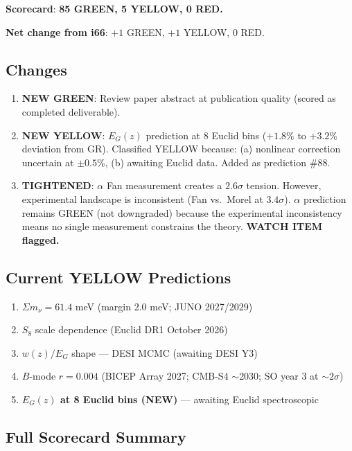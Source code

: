 \documentclass[11pt,a4paper]{article}
\newcommand{\GREEN}{\textcolor{dfdgreen}{\textbf{GREEN}}}
\newcommand{\YELLOW}{\textcolor{dfdyellow}{\textbf{YELLOW}}}
\newcommand{\RED}{\textcolor{dfdred}{\textbf{RED}}}
\begin{document}
\textbf{Scorecard}: \textbf{85 \GREEN, 5 \YELLOW, 0 \RED.}

\textbf{Net change from i66}: $+1$ GREEN, $+1$ YELLOW, $0$ RED.

\subsection{Changes}

\begin{enumerate}
\item \textbf{NEW GREEN}: Review paper abstract at publication quality (scored as completed deliverable).

\item \textbf{NEW YELLOW}: $E_G(z)$ prediction at 8 Euclid bins ($+1.8\%$ to $+3.2\%$ deviation from GR). Classified YELLOW because: (a) nonlinear correction uncertain at $\pm 0.5\%$, (b) awaiting Euclid data. Added as prediction \#88.

\item \textbf{TIGHTENED}: $\alpha$ Fan measurement creates a $2.6\sigma$ tension. However, experimental landscape is inconsistent (Fan vs.\ Morel at $3.4\sigma$). $\alpha$ prediction remains GREEN (not downgraded) because the experimental inconsistency means no single measurement constrains the theory. \textbf{WATCH ITEM flagged.}
\end{enumerate}

\subsection{Current YELLOW Predictions}

\begin{enumerate}
\item $\Sigma m_\nu = 61.4$ meV (margin 2.0 meV; JUNO 2027/2029)
\item $S_8$ scale dependence (Euclid DR1 October 2026)
\item $w(z)/E_G$ shape --- DESI MCMC (awaiting DESI Y3)
\item $B$-mode $r = 0.004$ (BICEP Array 2027; CMB-S4 $\sim$2030; SO year 3 at $\sim 2\sigma$)
\item \textbf{$E_G(z)$ at 8 Euclid bins (NEW)} --- awaiting Euclid spectroscopic
\end{enumerate}

\subsection{Full Scorecard Summary}
\end{document}
